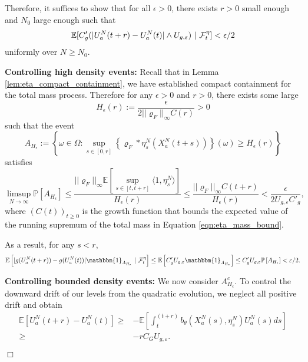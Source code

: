 \documentclass[12pt]{article}
\newenvironment {proof}{{\noindent\bf Proof }}{\hfill $\Box$ \medskip}
\begin{document}
\begin{proof}
Therefore, it suffices to show that for all $\epsilon > 0$, there exists $r>0$ small enough and $N_0$ large enough such that 
\begin{equation}
\mathbb{E}[C'_{g}(|U^{N}_{a}(t+r)-U^{N}_{a}(t)|\wedge U_{g,\varepsilon}) ~|~{\cal F}_t^{
\eta} ] < \epsilon /2    
\end{equation}
uniformly over $N \geq N_0$.

\textbf{Controlling high density events:}
Recall that in Lemma \ref{lem:eta_compact_containment}, we have established compact containment for the total mass process. Therefore for any $\epsilon>0$ and $r>0$, there exists some large 
\begin{equation}
    \label{eq: Mass Bound Constant}
H_{\epsilon}(r):=\frac{\epsilon}{2||\varrho_F||_{\infty}C(r) }>0    
\end{equation}
such that 
the event 
$$A_{H_{\epsilon}}:= \left\{ \omega \in \Omega: \sup_{s\in [0,r]}\left\{\varrho_F*\eta^N_s(X^N_a(t+s)) \right\}(\omega) \geq H_{\epsilon}(r) \right\}$$
satisfies
\begin{equation}
\limsup_{N \to \infty}\mathbb{P}\left[A_{H_{\epsilon}}\right]
\leq  \frac{||\varrho_F||_{\infty}\mathbb{E}[\sup_{s\in [t,t+r]}\langle 1,  \eta^N_s \rangle ]}{H_{\epsilon}(r)}
\leq  \frac{||\varrho_F||_{\infty}C(t+r)}{H_{\epsilon}(r)}
< \frac{\epsilon}{2 U_{g,\varepsilon}C'_g},
\end{equation}
where $(C(t))_{t \geq 0}$ is the growth function that bounds the expected value of the running supremum of the total mass in Equation \eqref{eqn:eta_mass_bound}.

As a result, for any $s < r$,
\begin{equation}
\mathbb{E}\left[|g(U^{N}_{a}(t+r ))-g(U^{N}_{a}(t))| \mathbbm{1}_{A_{H_{\epsilon}}} ~|~{\cal F}_t^{
\eta} \right] 
\leq  \mathbb{E}\left[C'_{g} U_{g,\varepsilon}\mathbbm{1}_{A_{H_{\epsilon}}} \right] \leq  C'_{g} U_{g,\varepsilon}\mathbb{P}\left[A_{H_{\epsilon}} \right] < \varepsilon / 2.
\end{equation}

\textbf{Controlling bounded density events:}
We now consider $A_{H_{\epsilon}}^{c}$.
To control the downward drift of our levels from the quadratic evolution,
we neglect all positive drift and obtain
\begin{equation}
\begin{aligned}
\mathbb{E}[U^{N}_{a}(t+r)-U^{N}_{a}(t)] \geq   &   - \mathbb{E}\left[\int_{t}^{(t+r)  } b_{\theta}(X^N_a(s),\eta^N_s) U^N_a(s)ds\right]\\
\geq& - rC_GU_{g,\varepsilon}.
\end{aligned}    
\end{equation}


\end{proof}
\end{document}
